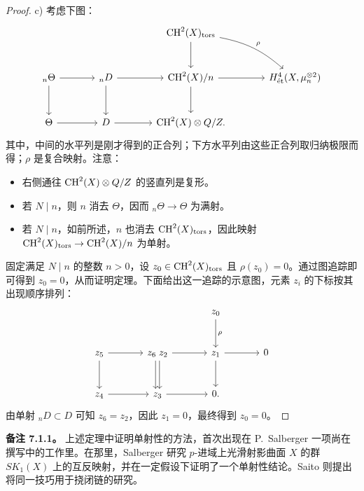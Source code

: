 \begin{proof}
c) 考虑下图：
\[
\begin{tikzcd}[ampersand replacement=\&,column sep=large,row sep=large]
 \&\&\CH^2(X)_{\tors}\arrow[d]\arrow[dr,bend left=15,"{\rho}"]\\
 {}_n\Theta\arrow[r]\arrow[d]\&{}_nD\arrow[r]\arrow[d]
 \&\CH^2(X)/n\arrow[r]\arrow[d]\&H^4_{\et}(X,\mu_n^{\otimes2})\\
 \Theta\arrow[r]\&D\arrow[r]\&\CH^2(X)\otimes\mathbb Q/\mathbb Z.
\end{tikzcd}
\]
其中，中间的水平列是刚才得到的正合列；下方水平列由这些正合列取归纳极限而得；$\rho$ 是复合映射。注意：
\begin{itemize}
\item 右侧通往 $\operatorname{CH}^2(X)\otimes Q/Z$ 的竖直列是复形。
\item 若 $N\mid n$，则 $n$ 消去 $\Theta$，因而 ${}_n\Theta\to\Theta$ 为满射。
\item 若 $N\mid n$，如前所述，$n$ 也消去 $\operatorname{CH}^2(X)_{\mathrm{tors}}$，因此映射 $\operatorname{CH}^2(X)_{\mathrm{tors}}\to\operatorname{CH}^2(X)/n$ 为单射。
\end{itemize}
固定满足 $N\mid n$ 的整数 $n>0$，设 $z_0\in\operatorname{CH}^2(X)_{\mathrm{tors}}$ 且 $\rho(z_0)=0$。通过图追踪即可得到 $z_0=0$，从而证明定理。下面给出这一追踪的示意图，元素 $z_i$ 的下标按其出现顺序排列：
\[
\begin{tikzcd}[ampersand replacement=\&,column sep=large,row sep=large]
 \&\&z_0\arrow[d,"{\rho}"]\\
 z_5\arrow[r]\arrow[d]\&z_6\;z_2\arrow[r]\arrow[d,shift left=2pt]\arrow[d,shift right=2pt]
 \&z_1\arrow[r]\arrow[d]\&0\\
 z_4\arrow[r]\&z_3\arrow[r]\&0.
\end{tikzcd}
\]
由单射 ${}_nD\subset D$ 可知 $z_6=z_2$，因此 $z_1=0$，最终得到 $z_0=0$。
\end{proof}

\noindent\textbf{备注 7.1.1。} 上述定理中证明单射性的方法，首次出现在 P.~Salberger 一项尚在撰写中的工作里。在那里，Salberger 研究 $p$-进域上光滑射影曲面 $X$ 的群 $SK_1(X)$ 上的互反映射，并在一定假设下证明了一个单射性结论。Saito 则提出将同一技巧用于挠闭链的研究。

